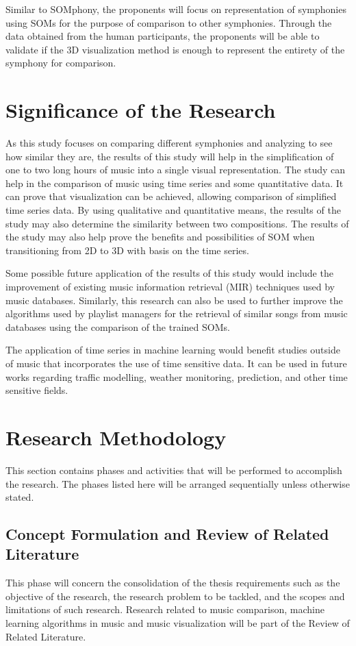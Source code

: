 Similar to SOMphony, the proponents will  focus on representation of symphonies using SOMs for the purpose of comparison to other symphonies. Through the data obtained from the human participants, the proponents will be able to validate if the 3D visualization method is enough to represent the entirety of the symphony for comparison.

\section{Significance of the Research}
\label{sec:significance}
As this study focuses on comparing different symphonies and analyzing to see how similar they are, the results of this study will help in the simplification of one to two long hours of music into a single visual representation.  The study can help in the comparison of music using time series and some quantitative data. It can prove that visualization can be achieved, allowing comparison of simplified time series data. By using qualitative and quantitative means, the results of the study may also determine the similarity between two compositions. The results of the study may also help prove the benefits and possibilities of SOM when transitioning from 2D to 3D with basis on the time series.

Some possible future application of the results of this study would include the improvement of existing music information retrieval (MIR) techniques used by music databases. Similarly, this research can also be used to further improve the algorithms used by playlist managers for the retrieval of similar songs from music databases using the comparison of the trained SOMs.

The application of time series in machine learning would benefit studies outside of music that incorporates the use of time sensitive data. It can be used in future works regarding traffic modelling, weather monitoring, prediction, and other time sensitive fields.

\section{Research Methodology}
\label{sec:researchmethod}
This section contains phases and activities that will be performed to accomplish the research. The phases listed here will be arranged sequentially unless otherwise stated.

\subsection{Concept Formulation and Review of Related Literature}
This phase will concern the consolidation of the thesis requirements such as the objective of the research, the research problem to be tackled, and the scopes and limitations of such research. Research related to music comparison, machine learning algorithms in music and music visualization will be part of the Review of Related Literature.

